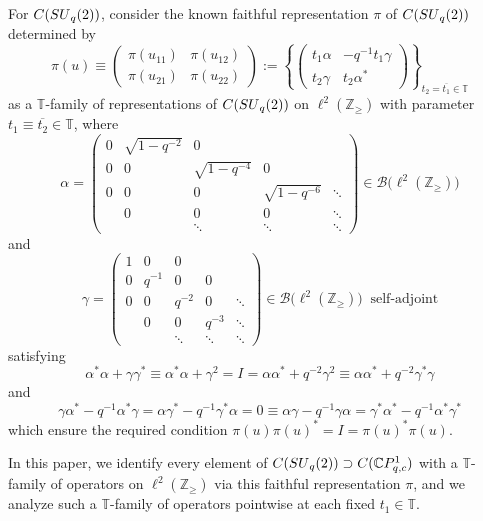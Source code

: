 \documentclass[11pt]{article}
\numberwithin{equation}{section}
\begin{document}
For $C ( {\rm SU}_{q}(2) ) $, consider the known faithful
representation $\pi$ of $C ( {\rm SU}_{q}(2) ) $
determined by
\[
\pi(u) \equiv\left(
\begin{matrix}
\pi ( u_{11} ) & \pi ( u_{12} ) \\
\pi ( u_{21} ) & \pi ( u_{22} )
\end{matrix}
\right) :=\left\{ \left(
\begin{matrix}
t_{1}\alpha & -q^{-1}t_{1}\gamma\\
t_{2}\gamma & t_{2}\alpha^{\ast}%
\end{matrix}
\right) \right\} _{t_{2}=\overline{t_{1}}\in\mathbb{T}}%
\]
as a $\mathbb{T}$-family of representations of $C( {\rm SU}_{q}(2) ) $ on $\ell^{2} ( \mathbb{Z}_{\geq}) $ with
parameter $t_{1}\equiv\overline{t_{2}}\in\mathbb{T}$, where
\[
\alpha=\left(
\begin{matrix}
0 & \sqrt{1-q^{-2}} & 0 & & \\
0 & 0 & \sqrt{1-q^{-4}} & 0 & \\
0 & 0 & 0 & \sqrt{1-q^{-6}} & \ddots\\
& 0 & 0 & 0 & \ddots\\
& & \ddots & \ddots & \ddots
\end{matrix}
\right) \in\mathcal{B}\big( \ell^{2}( \mathbb{Z}_{\geq})\big)
\]
and
\[
\gamma=\left(
\begin{matrix}
1 & 0 & 0 & & \\
0 & q^{-1} & 0 & 0 & \\
0 & 0 & q^{-2} & 0 & \ddots\\
& 0 & 0 & q^{-3} & \ddots\\
& & \ddots & \ddots & \ddots
\end{matrix}
\right) \in\mathcal{B}\big( \ell^{2} ( \mathbb{Z}_{\geq} )
\big) \ \text{\ \ self-adjoint}
\]
satisfying
\[
\alpha^{\ast}\alpha+\gamma\gamma^{\ast}\equiv\alpha^{\ast}\alpha+\gamma
^{2}=I=\alpha\alpha^{\ast}+q^{-2}\gamma^{2}\equiv\alpha\alpha^{\ast}%
+q^{-2}\gamma^{\ast}\gamma
\]
and
\[
\gamma\alpha^{\ast}-q^{-1}\alpha^{\ast}\gamma=\alpha\gamma^{\ast}-q^{-1}%
\gamma^{\ast}\alpha=0\equiv\alpha\gamma-q^{-1}\gamma\alpha=\gamma^{\ast}%
\alpha^{\ast}-q^{-1}\alpha^{\ast}\gamma^{\ast}%
\]
which ensure the required condition $\pi(u) \pi(u)
^{\ast}=I=\pi(u) ^{\ast}\pi(u) $.

In this paper, we identify every element of $C( {\rm SU}_{q}(2)
) \supset C ( \mathbb{C}P_{q,c}^{1} ) $ with a $\mathbb{T}$-family of operators on $\ell^{2} ( \mathbb{Z}_{\geq} ) $ via this
faithful representation $\pi$, and we analyze such a $\mathbb{T}$-family of
operators pointwise at each fixed $t_{1}\in\mathbb{T}$.
\end{document}

